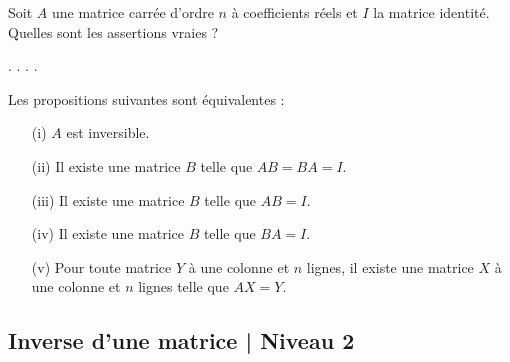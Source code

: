 \begin{question}
Soit $A$ une matrice carrée d'ordre $n$  à coefficients réels et $I$ la matrice identité. Quelles sont les assertions vraies ?
\begin{answers}  
.
.
.
.
\end{answers}
\begin{explanations} Les propositions suivantes sont équivalentes :
\begin{enumerate}
\item[(i)] $A$ est inversible.
\item[(ii)] Il existe une matrice $B$ telle que $AB=BA=I$.
\item[(iii)] Il existe une matrice $B$ telle que $AB=I$.
\item[(iv)] Il existe une matrice $B$ telle que $BA=I$.
\item[(v)] Pour toute matrice $Y$ à une colonne et $n$ lignes, il existe une matrice $X$ à une colonne et $n$ lignes telle que $AX=Y.$
\end{enumerate}
\end{explanations}
\end{question}

\subsection{Inverse d'une matrice | Niveau 2}

